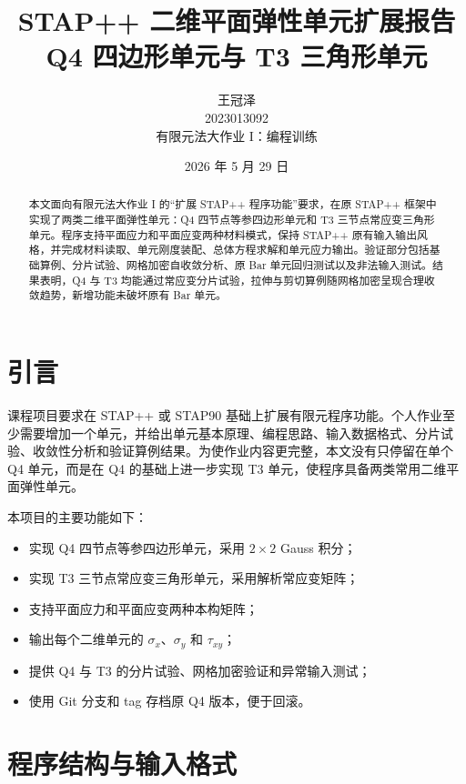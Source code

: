 ﻿\documentclass[UTF8,11pt,a4paper]{ctexart}
\title{STAP++ 二维平面弹性单元扩展报告\\Q4 四边形单元与 T3 三角形单元}
\author{王冠泽\\2023013092\\有限元法大作业 I：编程训练}
\date{2026 年 5 月 29 日}
\begin{document}
\maketitle

\begin{abstract}
本文面向有限元法大作业 I 的“扩展 STAP++ 程序功能”要求，在原 STAP++ 框架中实现了两类二维平面弹性单元：Q4 四节点等参四边形单元和 T3 三节点常应变三角形单元。程序支持平面应力和平面应变两种材料模式，保持 STAP++ 原有输入输出风格，并完成材料读取、单元刚度装配、总体方程求解和单元应力输出。验证部分包括基础算例、分片试验、网格加密自收敛分析、原 Bar 单元回归测试以及非法输入测试。结果表明，Q4 与 T3 均能通过常应变分片试验，拉伸与剪切算例随网格加密呈现合理收敛趋势，新增功能未破坏原有 Bar 单元。
\end{abstract}

\tableofcontents
\newpage

\section{引言}
课程项目要求在 STAP++ 或 STAP90 基础上扩展有限元程序功能。个人作业至少需要增加一个单元，并给出单元基本原理、编程思路、输入数据格式、分片试验、收敛性分析和验证算例结果。为使作业内容更完整，本文没有只停留在单个 Q4 单元，而是在 Q4 的基础上进一步实现 T3 单元，使程序具备两类常用二维平面弹性单元。

本项目的主要功能如下：
\begin{itemize}
  \item 实现 Q4 四节点等参四边形单元，采用 $2\times2$ Gauss 积分；
  \item 实现 T3 三节点常应变三角形单元，采用解析常应变矩阵；
  \item 支持平面应力和平面应变两种本构矩阵；
  \item 输出每个二维单元的 $\sigma_x$、$\sigma_y$ 和 $\tau_{xy}$；
  \item 提供 Q4 与 T3 的分片试验、网格加密验证和异常输入测试；
  \item 使用 Git 分支和 tag 存档原 Q4 版本，便于回滚。
\end{itemize}

\section{程序结构与输入格式}
\end{document}
